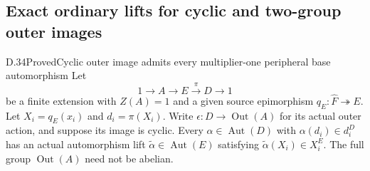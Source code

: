 \subsection{Exact ordinary lifts for cyclic and two-group outer images}

\begin{statement}{D.34}{Proved}{Cyclic outer image admits every multiplier-one peripheral base automorphism}
Let
\[
 1\longrightarrow A\longrightarrow E
       \xrightarrow{\pi}D\longrightarrow1
 \tag{D.34.1}
\]
be a finite extension with $Z(A)=1$ and
a given source epimorphism
$q_E:\widehat F\twoheadrightarrow E$.
Let $X_i=q_E(x_i)$ and $d_i=\pi(X_i)$.
Write
$\epsilon:D\to\operatorname{Out}(A)$
for its actual outer action, and suppose
its image is cyclic.
Every $\alpha\in\operatorname{Aut}(D)$
with $\alpha(d_i)\in d_i^D$ has an
actual automorphism lift
$\widetilde\alpha\in\operatorname{Aut}(E)$
satisfying
$\widetilde\alpha(X_i)\in X_i^E$.
The full group $\operatorname{Out}(A)$
need not be abelian.
\end{statement}

